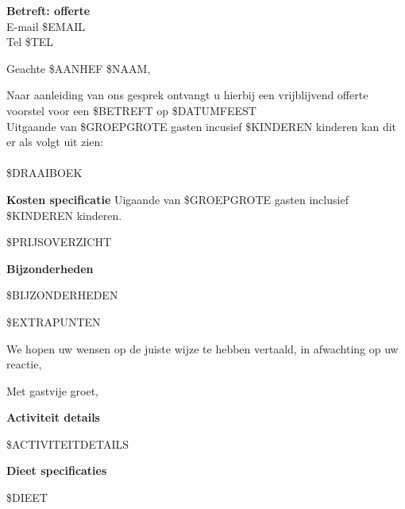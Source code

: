 \documentclass{letter}
\begin{document}

\signature{Pedro Klooster}
\address{\$NAAM \\ \$ADRESS \\ \$POSTCODE \$PLAATS}
\begin{letter}{
\textbf{Betreft: offerte}\\%
  E-mail \$EMAIL  \\
  Tel \$TEL
	}
\thispagestyle{empty}


\opening{Geachte \$AANHEF \$NAAM,}

Naar aanleiding van ons gesprek ontvangt u hierbij een vrijblijvend offerte voorstel
voor een \$BETREFT op \$DATUMFEEST \\

Uitgaande van \$GROEPGROTE gasten incusief \$KINDEREN kinderen kan dit er als volgt uit zien: \\\\
\$DRAAIBOEK

\newpage


\textbf{Kosten specificatie}
Uigaande van \$GROEPGROTE gasten inclusief \$KINDEREN kinderen.

\$PRIJSOVERZICHT

\textbf{Bijzonderheden}

\$BIJZONDERHEDEN

\$EXTRAPUNTEN

We hopen uw wensen op de juiste wijze te hebben vertaald, in afwachting op uw reactie, \\

\closing{Met gastvije groet,}


\end{letter}

\newpage

\textbf{Activiteit details}

\$ACTIVITEITDETAILS

\textbf{Dieet specificaties}

\$DIEET
\end{document}
